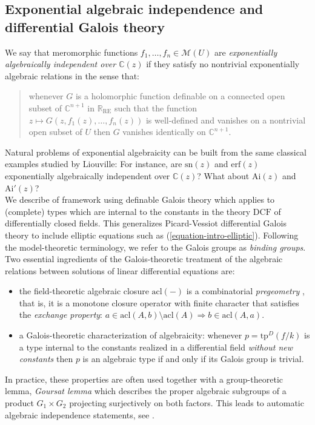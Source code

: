 \documentclass[12pt]{amsart}
\theoremstyle{definition}
\theoremstyle{plain}
\theoremstyle{exampstyle}\newtheorem{thmx}{Theorem}
\theoremstyle{exampstyle}\newtheorem{thmxbis}{Theorem}
\begin{document}
\subsection{Exponential algebraic independence and differential Galois theory} \text{ } We say that meromorphic functions $f_1,\ldots, f_n \in \mathcal M(U)$ are {\em exponentially algebraically independent over $\mathbb{C}(z)$} if they satisfy no nontrivial exponentially algebraic relations in the sense that: 
\begin{quote} 
whenever $G$ is a holomorphic function definable on a connected open subset of $\mathbb{C}^{n+1}$ in $\mathbb{R}_{\mathrm{RE}}$ such that the function  
$z \mapsto G(z,f_1(z),\ldots, f_n(z))$  is well-defined and vanishes on a nontrivial open subset of $U$ then $G$ vanishes identically on $\mathbb{C}^{n+1}$. 
\end{quote} 
Natural problems of exponential algebraicity can be built from the same classical examples studied by Liouville: For instance, are $\mathrm{sn}(z)$ and $\mathrm{erf}(z)$ exponentially algebraically independent over $\mathbb{C}(z)$? What about $\mathrm{Ai}(z)$ and $\mathrm{Ai}'(z)$?  \\




We describe of framework using definable Galois theory \cite{Pillay-Galois,Pillay-Leon-Sanchez} which applies to (complete) types which are internal to the constants in the theory $\mathrm{DCF}$ of differentially closed fields. This generalizes Picard-Vessiot differential Galois theory to include elliptic equations such as (\ref{equation-intro-elliptic}). Following the model-theoretic terminology, we refer to the Galois groups as {\em binding groups}. Two essential ingredients of the Galois-theoretic treatment of the algebraic relations between solutions of linear differential equations are:
\begin{itemize}
\item[(a)] the field-theoretic algebraic closure $\mathrm{acl}(-)$ is a combinatorial {\em pregeometry }, that is, it is a monotone closure operator with finite character that satisfies the {\em exchange property}: $a \in \mathrm{acl}(A,b) \setminus  \mathrm{acl}(A)  \Rightarrow b \in \mathrm{acl}(A,a)$.

\item[(b)] a Galois-theoretic characterization of algebraicity: whenever $p = \mathrm{tp}^D(f/k)$ is a type internal to the constants realized in a differential field {\em without new constants} then $p$ is an algebraic type if and only if its Galois group is trivial. \end{itemize}
In practice, these properties are often used together with a group-theoretic lemma, {\em Goursat lemma} which describes the proper algebraic subgroups of a product $G_1 \times G_2$ projecting surjectively on both factors. This leads to automatic  algebraic independence statements, see \cite{Kolchin}.
\end{document}
